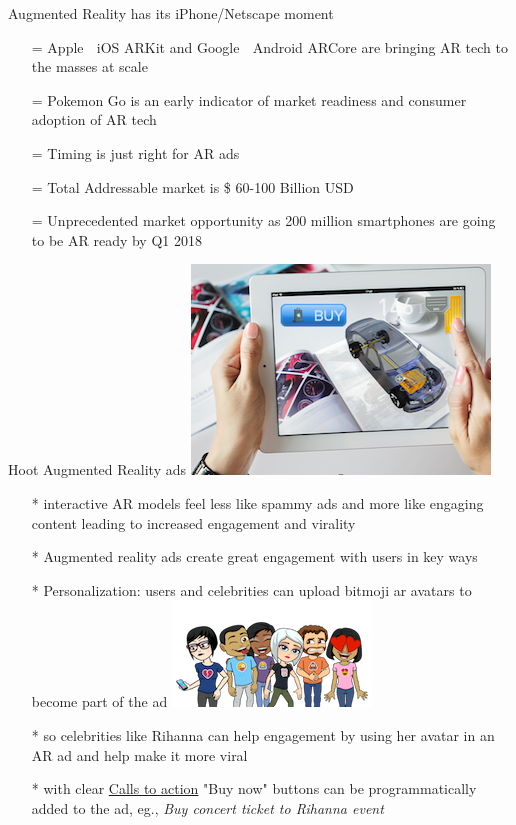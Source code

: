 \documentclass[12pt]{beamer}
\begin{document}
\begin{frame}[t]{Augmented Reality has its iPhone/Netscape moment}
\begin{itemize}
	\item[=]Apple 🍎
	 iOS ARKit and Google 🤖 Android ARCore are bringing AR tech to the masses at scale
	\pause
	\item[=]Pokemon Go is an early indicator of market readiness and consumer adoption of AR tech
	\pause
	\item[=]Timing is just right for AR ads
	\pause
	\item[=]Total Addressable market is \$ 60-100 Billion USD 
	\pause
	\item[=]Unprecedented market opportunity as 200 million smartphones are going to be AR ready by Q1 2018
\end{itemize}
\end{frame}
\begin{frame}[t]{Hoot Augmented Reality ads \includegraphics[scale=.1]{static/arad/arad5}} 
\begin{itemize}
\item[*]interactive AR models feel  less like spammy ads and more like engaging content leading to increased engagement and virality 
\pause	
\item[*]Augmented reality ads create great engagement with users in key ways
\pause
\item[*]Personalization: users and celebrities can upload bitmoji ar avatars to become part of the ad
\pause
\includegraphics[scale=.15]{static/arad/bitmoji} 
\pause
\item[*]so celebrities like Rihanna can help engagement by using her avatar in an AR ad and help make it more viral 
\pause
\item[*]with clear \underline{Calls to action} "Buy now" buttons can be programmatically added to the ad, eg., \emph{ Buy concert ticket to Rihanna event}
\end{itemize}
\end{frame}
\end{document}
